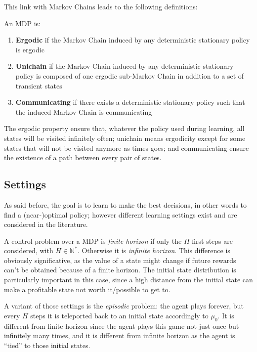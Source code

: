 This link with Markov Chains leads to the following definitions:

\begin{defi}
  An MDP is:
  \begin{enumerate}
  \item \textbf{Ergodic} if the Markov Chain induced by any deterministic stationary policy is ergodic
  \item \textbf{Unichain} if the Markov Chain induced by any deterministic stationary policy is composed of one ergodic sub-Markov Chain in addition to a set of transient states
  \item \textbf{Communicating} if there exists a deterministic stationary policy such that the induced Markov Chain is communicating
  \end{enumerate}
\end{defi}

The ergodic property ensure that, whatever the policy used during learning, all states will be visited infinitely often; unichain means ergodicity except for some states that will not be visited anymore as times goes; and communicating ensure the existence of a path between every pair of states.

\subsection{Settings}
\label{subsec:MDP-settings}

As said before, the goal is to learn to make the best decisions, in other words to find a (near-)optimal policy; however different learning settings exist and are considered in the literature.

A control problem over a MDP is \emph{finite horizon} if only the $H$ first steps are considered, with $H \in \mathbb{N}^*$. Otherwise it is \emph{infinite horizon}. This difference is obviously significative, as the value of a state might change if future rewards can't be obtained because of a finite horizon. The initial state distribution is particularly important in this case, since a high distance from the initial state can make a profitable state not worth it/possible to get to.

A variant of those settings is the \emph{episodic} problem: the agent plays forever, but every $H$ steps it is teleported back to an initial state accordingly to $\mu_0$. It is different from finite horizon since the agent plays this game not just once but infinitely many times, and it is different from infinite horizon as the agent is ``tied'' to those initial states.

